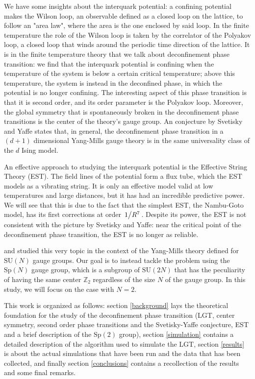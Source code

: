 \documentclass[reqno,12pt]{article}
\numberwithin{equation}{section}
\newcommand{\SU}{\mathrm{SU}}
\newcommand{\Sp}{\mathrm{Sp}}
\begin{document}
We have some insights about the interquark potential: a confining potential makes the Wilson loop, an observable defined
as a closed loop on the lattice, to follow an "area law", where the area is the one enclosed by said loop. In the
finite temperature the role of the Wilson loop is taken by the correlator of the Polyakov loop, a closed loop that winds
around the periodic time direction of the lattice. It is in the finite temperature theory that we talk about deconfinement
phase transition: we find that the interquark potential is confining when the temperature of the system is below a certain
critical temperature; above this temperature, the system is instead in the deconfined phase, in which the potential is 
no longer confining. The interesting aspect of this phase transition is that it is second order, and its order parameter
is the Polyakov loop. Moreover, the global symmetry that is spontaneously broken in the deconfinement phase transitions
is the center of the theory's gauge group. An conjecture by Svetisky and Yaffe states that, in general, the deconfinement
phase transition in a $(d+1)$ dimensional Yang-Mills gauge theory is in the same universality class of the $d$ Ising model.

An effective approach to studying the interquark potential is the Effective String Theory (EST). The field lines of the 
potential form a flux tube, which the EST models as a vibrating string. It is only an effective model valid at low temperatures
and large distances, but it has had an incredible predictive power. We will see that this is due to the fact that the simplest 
EST, the Nambu-Goto model, has its first corrections at order $\flatfrac{1}{R^7}$. Despite its power, the EST is not consistent
with the picture by Svetisky and Yaffe: near the critical point of the deconfinement phase transition, the EST is no longer
as reliable. 

\cite{caselle} and \cite{caristo} studied this very topic in the context of the Yang-Mills theory defined for $\SU(N)$
gauge groups. Our goal is to instead tackle the problem using the $\Sp(N)$ gauge group, which is a subgroup of $\SU(2N)$ that
has the peculiarity of having the same center $\mathbb{Z}_2$ regardless of the size $N$ of the gauge group. In this study, 
we will focus on the case with $N=2$. 

This work is organized as follows: section \ref{background} lays the theoretical foundation for the study of the 
deconfinement phase transition (LGT, center symmetry, second order phase transitions and the Svetisky-Yaffe conjecture,
EST and a brief description of the $\Sp(2)$ group), section \ref{simulation} contains a detailed description of the
algorithm used to simulate the LGT, section \ref{results} is about the actual simulations that have been run and the data that
has been collected, and finally section \ref{conclusions} contains a recollection of the results and some final remarks.
\end{document}
